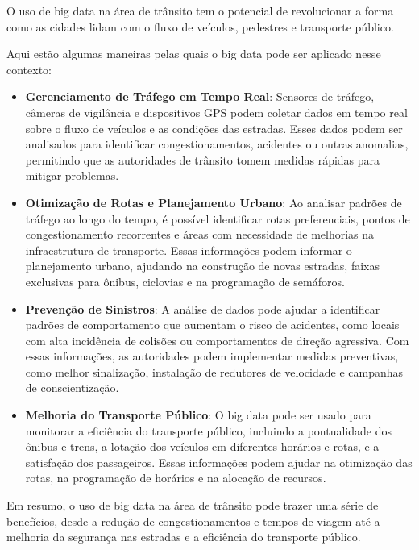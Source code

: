 O uso de big data na área de trânsito tem o potencial de revolucionar a forma como as cidades lidam com o fluxo de veículos, pedestres e transporte público.\vskip0.3cm 

Aqui estão algumas maneiras pelas quais o big data pode ser aplicado nesse contexto:

\begin{itemize}
    \item \textbf{Gerenciamento de Tráfego em Tempo Real}: Sensores de tráfego, câ\-me\-ras de vigilância e dispositivos GPS podem coletar dados em tempo real sobre o fluxo de veículos e as condições das estradas. Esses dados podem ser analisados para identificar congestionamentos, acidentes ou outras anomalias, permitindo que as autoridades de trânsito tomem medidas rápidas para mitigar problemas.
    \item \textbf{Otimização de Rotas e Planejamento Urbano}: Ao analisar padrões de trá\-fego ao longo do tempo, é possível identificar rotas preferenciais, pontos de congestionamento recorrentes e áreas com necessidade de melhorias na infraestrutura de transporte. Essas informações podem informar o planejamento urbano, ajudando na construção de novas estradas, faixas exclusivas para ônibus, ciclovias e na programação de semáforos.
    \item \textbf{Prevenção de Sinistros}: A análise de dados pode ajudar a identificar padrões de comportamento que aumentam o risco de acidentes, como locais com alta incidência de colisões ou comportamentos de direção agressiva. Com essas informações, as autoridades podem implementar medidas preventivas, como melhor sinalização, instalação de redutores de velocidade e campanhas de conscientização.
    \item \textbf{Melhoria do Transporte Público}: O big data pode ser usado para monitorar a eficiência do transporte público, incluindo a pontualidade dos ônibus e trens, a lotação dos veículos em diferentes horários e rotas, e a satisfação dos passageiros. Essas informações podem ajudar na otimização das rotas, na programação de horários e na alocação de recursos.
\end{itemize}

Em resumo, o uso de big data na área de trânsito pode trazer uma série de benefícios, desde a redução de congestionamentos e tempos de viagem até a melhoria da segurança nas estradas e a eficiência do transporte público. 


